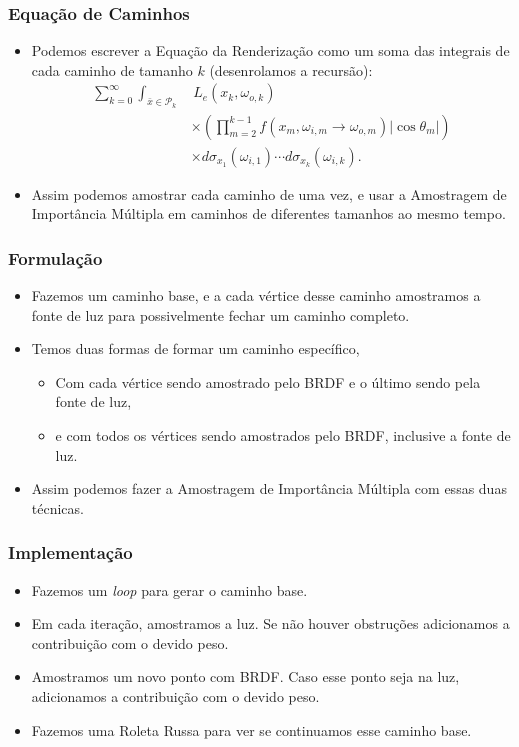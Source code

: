 \documentclass{beamer}
\begin{document}
\begin{frame}
\frametitle{Equação de Caminhos}

  \begin{itemize}
    \item<1-> Podemos escrever a Equação da Renderização como um soma das integrais
      de cada caminho de tamanho $k$ (desenrolamos a recursão):
      \[
        \begin{aligned}
        \sum_{k=0}^\infty \int_{\bar{x} \in \mathcal{P}_k}
        &\, L_e(x_k, \omega_{o,k}) \\
        &\times \left(
        \prod_{m=2}^{k-1}
        f(x_m, \omega_{i,m} \rightarrow \omega_{o,m})
        |\cos\theta_m|
        \right) \\
        &\times d\sigma_{x_1}(\omega_{i,1})
        \cdots
        d\sigma_{x_k}(\omega_{i,k}).
        \end{aligned}
      \]
    \item<2-> Assim podemos amostrar cada caminho de uma vez, e usar a
      Amostragem de Importância Múltipla em caminhos de diferentes tamanhos ao
      mesmo tempo.
  \end{itemize}
\end{frame}

\begin{frame}
\frametitle{Formulação}
  \begin{itemize}
    \item<1-> Fazemos um caminho base, e a cada vértice desse caminho
      amostramos a fonte de luz para possivelmente fechar um caminho completo.
    \item<2-> Temos duas formas de formar um caminho específico,
      \begin{itemize}
        \item<3-> Com cada vértice sendo amostrado pelo BRDF e o último sendo pela fonte de luz,
        \item<4-> e com todos os vértices sendo amostrados pelo BRDF, inclusive a fonte de luz. 
      \end{itemize}
    \item<5-> Assim podemos fazer a Amostragem de Importância Múltipla com essas duas técnicas.
  \end{itemize}
\end{frame}

\begin{frame}
\frametitle{Implementação}
  \begin{itemize}
    \item<1-> Fazemos um \emph{loop} para gerar o caminho base.
    \item<2-> Em cada iteração, amostramos a luz. Se não houver obstruções adicionamos a contribuição com o devido peso.
    \item<3-> Amostramos um novo ponto com BRDF. Caso esse ponto seja na luz, adicionamos a contribuição com o devido peso.
    \item<4-> Fazemos uma Roleta Russa para ver se continuamos esse caminho base.
  \end{itemize}
\end{frame}
\end{document}
